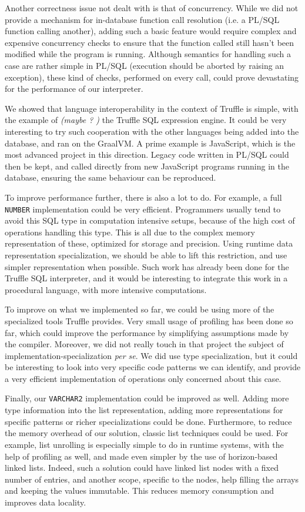\documentclass[twoside,11pt,a4paper]{article}
\newcommand{\maybe}[1]{\textit{(maybe ? #1)}}
\newcommand{\pls}[1]{\texttt{#1}}
\newcommand{\plstype}[1]{\pls{#1}}
\newcommand{\varchar}{\plstype{VARCHAR2}}
\newcommand{\oranum}{\plstype{NUMBER}}
\begin{document}
Another correctness issue not dealt with is that of concurrency. While we did not provide a mechanism for in-database function call resolution (i.e. a PL/SQL function calling another), adding such a basic feature would require complex and expensive concurrency checks to ensure that the function called still hasn't been modified while the program is running. Although semantics for handling such a case are rather simple in PL/SQL (execution should be aborted by raising an exception), these kind of checks, performed on every call, could prove devastating for the performance of our interpreter.

We showed that language interoperability in the context of Truffle is simple, with the example of \maybe{} the Truffle SQL expression engine. It could be very interesting to try such cooperation with the other languages being added into the database, and ran on the GraalVM. A prime example is JavaScript, which is the most advanced project in this direction. Legacy code written in PL/SQL could then be kept, and called directly from new JavaScript programs running in the database, ensuring the same behaviour can be reproduced.

To improve performance further, there is also a lot to do. For example, a full \oranum{} implementation could be very efficient. Programmers usually tend to avoid this SQL type in computation intensive setups, because of the high cost of operations handling this type. This is all due to the complex memory representation of these, optimized for storage and precision. Using runtime data representation specialization, we should be able to lift this restriction, and use simpler representation when possible. Such work has already been done for the Truffle SQL interpreter, and it would be interesting to integrate this work in a procedural language, with more intensive computations.

To improve on what we implemented so far, we could be using more of the specialized tools Truffle provides. Very small usage of profiling has been done so far, which could improve the performance by simplifying assumptions made by the compiler. Moreover, we did not really touch in that project the subject of implementation-specialization \textit{per se}. We did use type specialization, but it could be interesting to look into very specific code patterns we can identify, and provide a very efficient implementation of operations only concerned about this case.

Finally, our \varchar{} implementation could be improved as well. Adding more type information into the list representation, adding more representations for specific patterns or richer specializations could be done. Furthermore, to reduce the memory overhead of our solution, classic list techniques could be used. For example, list unrolling is especially simple to do in runtime systems, with the help of profiling as well, and made even simpler by the use of horizon-based linked lists. Indeed, such a solution could have linked list nodes with a fixed number of entries, and another scope, specific to the nodes, help filling the arrays and keeping the values immutable. This reduces memory consumption and improves data locality.
\end{document}
